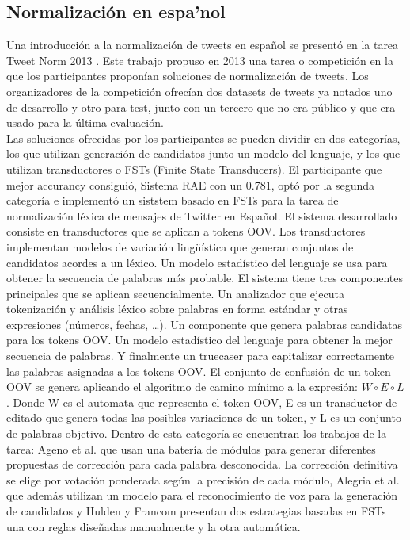 \documentclass[spanish,12pt, a4paper,twoside]{paper}
\begin{document}
\subsection{Normalización en espa'nol}\label{sec:normalzacionenespanol}
Una introducción a la normalización de tweets en español se presentó en la tarea Tweet Norm 2013 \cite{alegria:2013}\cite{alegria:2015}. Este trabajo propuso en 2013 una tarea o competición en la que los participantes proponían soluciones de normalización de tweets. Los organizadores de la competición ofrecían dos datasets de tweets ya notados uno de desarrollo y otro para test, junto con un tercero que no era público y que era usado para la última evaluación.\\

Las soluciones ofrecidas por los participantes se pueden dividir en dos categorías, los que utilizan generación de candidatos junto un modelo del lenguaje, y los que utilizan transductores o FSTs (Finite State Transducers). El participante que mejor accurancy consiguió, Sistema RAE \cite{porta:2013} con un 0.781, optó por la segunda categoría e implementó un siststem basado en FSTs para la tarea de normalización léxica de mensajes de Twitter en Español. El sistema desarrollado consiste en transductores que se aplican a tokens OOV. Los transductores implementan modelos de variación lingüística que generan conjuntos de candidatos acordes a un léxico. Un modelo estadístico del lenguaje se usa para obtener la secuencia de palabras más probable. El sistema tiene tres componentes principales que se aplican secuencialmente. Un analizador que ejecuta tokenización y análisis léxico sobre palabras en forma estándar y otras expresiones (números, fechas, …). Un componente que genera palabras candidatas para los tokens OOV. Un modelo estadístico del lenguaje para obtener la mejor secuencia de palabras. Y finalmente un truecaser para capitalizar correctamente las palabras asignadas a los tokens OOV. El conjunto de confusión de un token OOV se genera aplicando el algoritmo de camino mínimo a la expresión: $W \circ E \circ L$. Donde W es el automata que representa el token OOV, E es un transductor de editado que genera todas las posibles variaciones de un token, y L es un conjunto de palabras objetivo. Dentro de esta categoría se encuentran los trabajos de la tarea: Ageno et al. \cite{ageno:2013} que usan una batería de módulos para generar diferentes propuestas de corrección para cada palabra desconocida. La corrección definitiva se elige por votación ponderada según la precisión de cada módulo, Alegria et al. \cite{alegria:2013} que además utilizan un modelo para el reconocimiento de voz para la generación de candidatos y Hulden y Francom \cite{huldenfrancom:2013} presentan dos estrategias basadas en FSTs una con reglas diseñadas manualmente y la otra automática.\\
\end{document}
